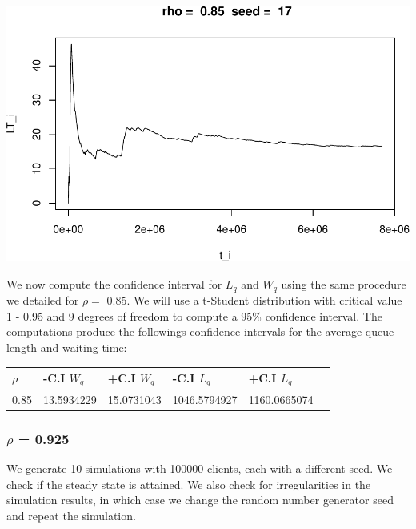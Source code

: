 \documentclass[]{article}
\begin{document}
\includegraphics{003_files/figure-latex/unnamed-chunk-21-10.pdf}

We now compute the confidence interval for \(L_{q}\) and \(W_{q}\) using
the same procedure we detailed for \(\rho =\) 0.85. We will use a
t-Student distribution with critical value 1 - 0.95 and 9 degrees of
freedom to compute a 95\% confidence interval. The computations produce
the followings confidence intervals for the average queue length and
waiting time:

\begin{longtable}[]{@{}llllll@{}}
\toprule
\(\rho\) & -C.I \(W_{q}\) & +C.I \(W_{q}\) & -C.I \(L_{q}\) & +C.I
\(L_{q}\) &\tabularnewline
\midrule
\endhead
0.85 & 13.5934229 & 15.0731043 & 1046.5794927 &
1160.0665074\tabularnewline
\bottomrule
\end{longtable}

\subsubsection{\texorpdfstring{\(\rho\) =
0.925}{\textbackslash{}rho = 0.925}}\label{rho-0.925}

We generate 10 simulations with 100000 clients, each with a different
seed. We check if the steady state is attained. We also check for
irregularities in the simulation results, in which case we change the
random number generator seed and repeat the simulation.
\end{document}
